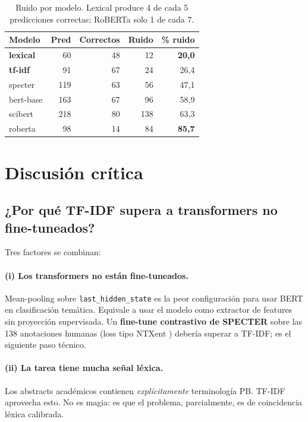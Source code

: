 \documentclass[11pt,a4paper]{article}
\newcommand{\good}[1]{\textbf{\textcolor{accent}{#1}}}
\newcommand{\bad}[1]{\textbf{\textcolor{bad}{#1}}}
\begin{document}
\begin{table}[h]
\centering\small
\begin{tabular}{l rrrr}
\toprule
\textbf{Modelo} & \textbf{Pred} & \textbf{Correctos} & \textbf{Ruido} & \textbf{\% ruido} \\
\midrule
\good{lexical} & 60 & 48 & 12 & \good{20{,}0} \\
\good{tf-idf} & 91 & 67 & 24 & 26{,}4 \\
specter & 119 & 63 & 56 & 47{,}1 \\
bert-base & 163 & 67 & 96 & 58{,}9 \\
scibert & 218 & 80 & 138 & 63{,}3 \\
roberta & 98 & 14 & 84 & \bad{85{,}7} \\
\bottomrule
\end{tabular}
\caption{Ruido por modelo. Lexical produce 4 de cada 5 predicciones correctas; RoBERTa solo 1 de cada 7.}
\end{table}

\section{Discusión crítica}\label{sec:discusion}

\subsection{¿Por qué TF-IDF supera a transformers no fine-tuneados?}

Tres factores se combinan:

\paragraph{(i) Los transformers no están fine-tuneados.} Mean-pooling sobre \texttt{last\_hidden\_state} es la peor configuración para usar BERT en clasificación temática. Equivale a usar el modelo como extractor de features sin proyección supervisada. Un \textbf{fine-tune contrastivo de SPECTER} sobre las 138 anotaciones humanas (loss tipo NTXent \cite{chen2020simple}) debería superar a TF-IDF; es el siguiente paso técnico.

\paragraph{(ii) La tarea tiene mucha señal léxica.} Los abstracts académicos contienen \emph{explícitamente} terminología PB. TF-IDF aprovecha esto. No es magia: es que el problema, parcialmente, es de coincidencia léxica calibrada.
\end{document}
